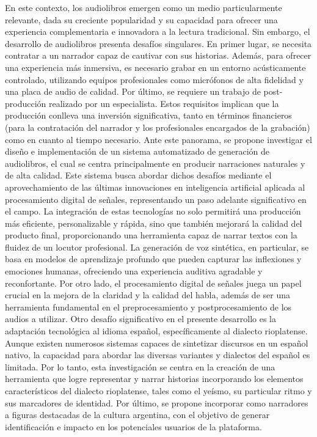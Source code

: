 En este contexto, los audiolibros emergen como un medio particularmente relevante, dada su creciente popularidad y su capacidad para ofrecer una experiencia complementaria e innovadora a la lectura tradicional. Sin embargo, el desarrollo de audiolibros presenta desafíos singulares. En primer lugar, se necesita contratar a un narrador capaz de cautivar con sus historias. Además, para ofrecer una experiencia más inmersiva, es necesario grabar en un entorno acústicamente controlado, utilizando equipos profesionales como micrófonos de alta fidelidad y una placa de audio de calidad. Por último, se requiere un trabajo de post-producción realizado por un especialista. Estos requisitos implican que la producción conlleva una inversión significativa, tanto en términos financieros (para la contratación del narrador y los profesionales encargados de la grabación) como en cuanto al tiempo necesario. Ante este panorama, se propone investigar el diseño e implementación de un sistema automatizado de generación de audiolibros, el cual se centra principalmente en producir narraciones naturales y de alta calidad. Este sistema busca abordar dichos desafíos mediante el aprovechamiento de las últimas innovaciones en inteligencia artificial aplicada al procesamiento digital de señales, representando un paso adelante significativo en el campo. La integración de estas tecnologías no solo permitirá una producción más eficiente, personalizable y rápida, sino que también mejorará la calidad del producto final, proporcionando una herramienta capaz de narrar textos con la fluidez de un locutor profesional. La generación de voz sintética, en particular, se basa en modelos de aprendizaje profundo que pueden capturar las inflexiones y emociones humanas, ofreciendo una experiencia auditiva agradable y reconfortante. Por otro lado, el procesamiento digital de señales juega un papel crucial en la mejora de la claridad y la calidad del habla, además de ser una herramienta fundamental en el preprocesamiento y postprocesamiento de los audios a utilizar. Otro desafío significativo en el presente desarrollo es la adaptación tecnológica al idioma español, específicamente al dialecto rioplatense. Aunque existen numerosos sistemas capaces de sintetizar discursos en un español nativo, la capacidad para abordar las diversas variantes y dialectos del español es limitada. Por lo tanto, esta investigación se centra en la creación de una herramienta que logre representar y narrar historias incorporando los elementos característicos del dialecto rioplatense, tales como el yeísmo, su particular ritmo y sus marcadores de identidad. Por último, se propone incorporar como narradores a figuras destacadas de la cultura argentina, con el objetivo de generar identificación e impacto en los potenciales usuarios de la plataforma.


